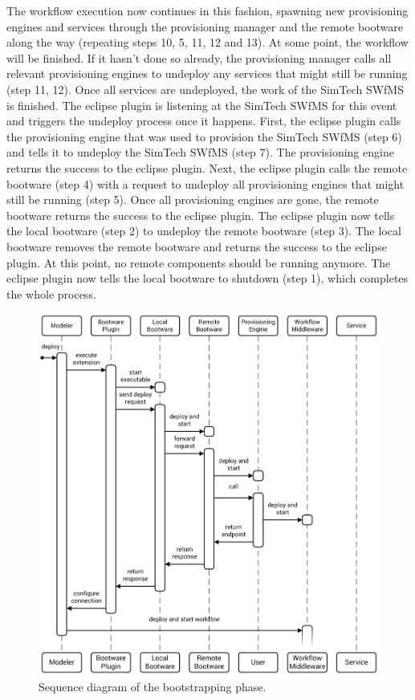 The workflow execution now continues in this fashion, spawning new provisioning engines and services through the provisioning manager and the remote bootware along the way (repeating steps 10, 5, 11, 12 and 13).
At some point, the workflow will be finished.
If it hasn't done so already, the provisioning manager calls all relevant provisioning engines to undeploy any services that might still be running (step 11, 12).
Once all services are undeployed, the work of the SimTech SWfMS is finished.
The eclipse plugin is listening at the SimTech SWfMS for this event and triggers the undeploy process once it happens.
First, the eclipse plugin calls the provisioning engine that was used to provision the SimTech SWfMS (step 6) and tells it to undeploy the SimTech SWfMS (step 7).
The provisioning engine returns the success to the eclipse plugin.
Next, the eclipse plugin calls the remote bootware (step 4) with a request to undeploy all provisioning engines that might still be running (step 5).
Once all provisioning engines are gone, the remote bootware returns the success to the eclipse plugin.
The eclipse plugin now tells the local bootware (step 2) to undeploy the remote bootware (step 3).
The local bootware removes the remote bootware and returns the success to the eclipse plugin.
At this point, no remote components should be running anymore.
The eclipse plugin now tells the local bootware to shutdown (step 1), which completes the whole process.

\begin{figure}[!htbp]
	\centering
	\includegraphics[resolution=600]{process/assets/bootstrapping_sequence}
	\caption{Sequence diagram of the bootstrapping phase.}
	\label{image:startup_sequence}
\end{figure}

